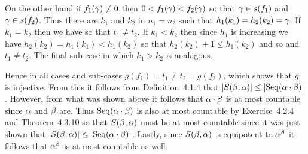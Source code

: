 \begin{solution}
  On the other hand if $f_1(\gamma) \neq 0$ then $0 < f_1(\gamma) < f_2(\gamma)$ so that $\gamma \in s(f_1)$ and $\gamma \in s(f_2)$.
  Thus there are $k_1$ and $k_2$ in $n_1 = n_2$ such that $h_1(k_1) = h_2(k_2) = \gamma$.
  If $k_1 = k_2$ then we have
  so that $t_1 \neq  t_2$.
  If $k_1 < k_2$ then since $h_1$ is increasing we have $h_2(k_2) = h_1(k_1) < h_1(k_2)$ so that $h_2(k_2) + 1 \leq h_1(k_2)$ and so
  and $t_1 \neq t_2$.
  The final sub-case in which $k_1 > k_2$ is analagous.
  
  Hence in all cases and sub-cases $g(f_1) = t_1 \neq t_2 = g(f_2)$, which shows that $g$ is injective.
  From this it follows from Definition~4.1.4 that $\left| S(\beta, \alpha) \right| \leq \left| \mathrm{Seq}(\alpha \cdot \beta) \right|$.
  However, from what was shown above it follows that $\alpha \cdot \beta$ is at most countable since $\alpha$ and $\beta$ are.
  Thus $\mathrm{Seq}(\alpha \cdot \beta)$ is also at most countable by Exercise~4.2.4 and Theorem~4.3.10 so that $S(\beta, \alpha)$ must be at most countable since it was just shown that $\left| S(\beta, \alpha) \right| \leq \left| \mathrm{Seq}(\alpha \cdot \beta) \right|$.
  Lastly, since $S(\beta, \alpha)$ is equipotent to $\alpha^\beta$ it follows that $\alpha^\beta$ is at most countable as well. \qedsymbol
\end{solution}

\def\ex{7.1.3}
\setcounter{itm}{0}
\question{\ex}

